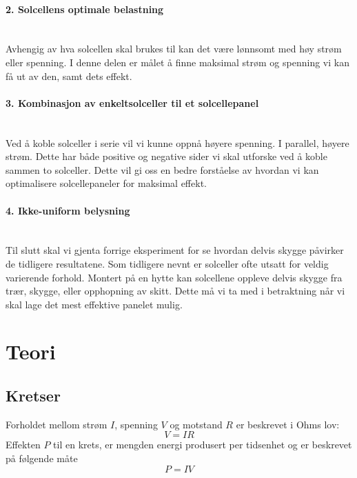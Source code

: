 \documentclass[reprint,norsk,notitlepage]{revtex4-2}
\begin{document}
\paragraph*{2. Solcellens optimale belastning}\mbox{}\\
Avhengig av hva solcellen skal brukes til kan det være lønnsomt med høy strøm eller spenning. I denne delen er målet å finne maksimal strøm og spenning vi kan få ut av den, samt dets effekt.\newline

\paragraph*{3. Kombinasjon av enkeltsolceller til et solcellepanel}\mbox{}\\
Ved å koble solceller i serie vil vi kunne oppnå høyere spenning. I parallel, høyere strøm. Dette har både positive og negative sider vi skal utforske ved å koble sammen to solceller. Dette vil gi oss en bedre forståelse av hvordan vi kan optimalisere solcellepaneler for maksimal effekt.\newline
  
\paragraph*{4. Ikke-uniform belysning}\mbox{}\\
Til slutt skal vi gjenta forrige eksperiment for se hvordan delvis skygge påvirker de tidligere resultatene. Som tidligere nevnt er solceller ofte utsatt for veldig varierende forhold. Montert på en hytte kan solcellene oppleve delvis skygge fra trær, skygge, eller opphopning av skitt. Dette må vi ta med i betraktning når vi skal lage det mest effektive panelet mulig. 


\section{Teori} \label{sec: theory}
\subsection{Kretser}
Forholdet mellom strøm $I$, spenning $V$ og motstand $R$ er beskrevet i Ohms lov: 
\begin{equation}\label{eq: Ohms lov}
  V = IR
\end{equation}
Effekten $P$ til en krets, er mengden energi produsert per tidsenhet og er beskrevet på følgende måte
\begin{equation}\label{eq: Effekt}
  P = IV
\end{equation}
\end{document}
